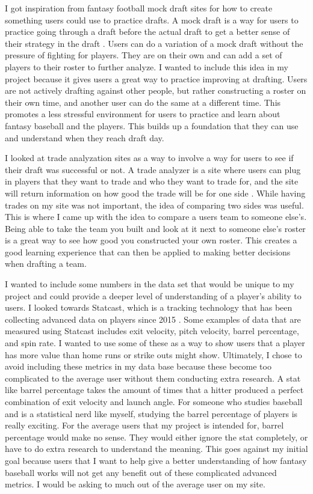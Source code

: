 \documentclass[10pt,twocolumn]{article}
\begin{document}
	 I got inspiration from  fantasy football mock draft sites for how to create something users could use to practice drafts. A mock draft is a way for users to practice going through a draft before the actual draft to get a better sense of their strategy in the draft \cite{DraftWizard}. Users can do a variation of a mock draft without the pressure of fighting for players. They are on their own and can add a set of players to their roster to further analyze. I wanted to include this idea in my project because it gives users a great way to practice improving at drafting. Users are not actively drafting against other people, but rather constructing a roster on their own time, and another user can do the same at a different time. This promotes a less stressful environment for users to practice and learn about fantasy baseball and the players. This builds up a foundation that they can use and understand when they reach draft day. 
	 
	 I looked at trade analyzation sites as a way to involve a way for users to see if their draft was successful or not. A trade analyzer is a site where users can plug in players that they want to trade and who they want to trade for, and the site will return information on how good the trade will be for one side \cite{Rotorade}. While having trades on my site was not important, the idea of comparing two sides was useful. This is where I came up with the idea to compare a users team to someone else's. Being able to take the team you built and look at it next to someone else's roster is a great way to see how good you constructed your own roster. This creates a good learning experience that can then be applied to making better decisions when drafting a team. 
	 
	 I wanted to include some numbers in the data set that would be unique to my project and could provide a deeper level of understanding of a player's ability to users. I looked towards Statcast, which is a tracking technology that has been collecting advanced data on players since 2015 \cite{Statcast}. Some examples of data that are measured using Statcast includes exit velocity, pitch velocity, barrel percentage, and spin rate. I wanted to use some of these as a way to show users that a player has more value than home runs or strike outs might show. Ultimately, I chose to avoid including these metrics in my data base because these become too complicated to the average user without them conducting extra research. A stat like barrel percentage takes the amount of times that a hitter produced a perfect combination of exit velocity and launch angle. For someone who studies baseball and is a statistical nerd like myself, studying the barrel percentage of players is really exciting. For the average users that my project is intended for, barrel percentage would make no sense. They would either ignore the stat completely, or have to do extra research to understand the meaning. This goes against my initial goal because users that I want to help give a better understanding of how fantasy baseball works will not get any benefit out of these complicated advanced metrics. I would be asking to much out of the average user on my site. 
	 
\end{document}
